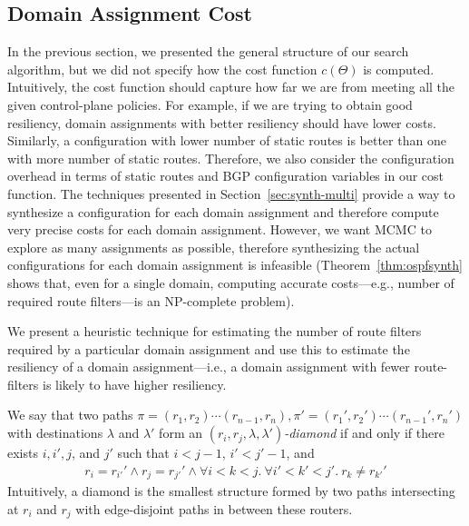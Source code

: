 \subsection{Domain Assignment Cost}
In the previous section, we presented the general structure of our search algorithm,
but we did not specify how the cost function $c(\Theta)$
is computed. Intuitively, the cost function should capture
how far we are from meeting all the given control-plane policies.
For example, if we are trying to obtain good resiliency,
domain assignments with better resiliency should have lower costs.
Similarly, a configuration with lower number of static routes is better
than one with more number of static routes. Therefore, we also consider 
the configuration overhead in terms of static routes and BGP configuration
variables in our cost function.
The techniques presented in Section~\ref{sec:synth-multi} provide a way to 
synthesize a configuration for each domain assignment and therefore compute
very precise costs for each domain assignment. 
However, 
we want MCMC to explore as many assignments as possible,
therefore 
synthesizing the actual configurations for
each domain assignment is infeasible (Theorem~\ref{thm:ospfsynth} shows that, 
even for a single domain, computing accurate costs---e.g., 
number of required route filters---is an NP-complete problem).


We present a heuristic technique for estimating the number of route 
filters required by a particular domain assignment and use this 
to estimate the resiliency of a domain assignment---i.e., a domain assignment with fewer 
route-filters is likely to have higher resiliency. 


We say that two paths $\pi=(r_1,r_2)\cdots (r_{n-1},r_n), \pi'=(r_1',r_2')\cdots (r_{n-1}',r_n')$ with destinations $\lambda$ and $\lambda'$
form an $(r_i, r_j, \lambda, \lambda')$\emph{-diamond} if and only if
there exists $i,i',j$, and $j'$ such that $i<j-1$, $i'<j'-1$, and
\begin{multline}
r_i{=}r_{i'}' \wedge  r_j{=}r_{j'}' \wedge  \forall i{<}k{<}j.~\forall i'{<}k'{<}j'.~r_{k}{\neq} r_{k'}'  
\end{multline}
Intuitively, a diamond is the smallest structure formed by two
paths intersecting at $r_i$ and $r_j$ with edge-disjoint paths in 
between these routers. 

